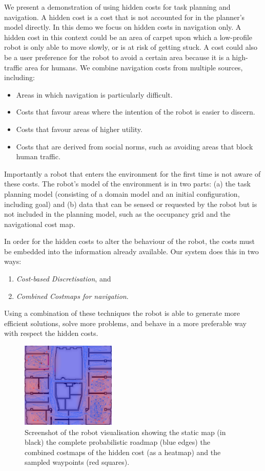 \documentclass[letterpaper]{article}
\begin{document}
We present a demonstration of using hidden costs for task planning and navigation.
%
A hidden cost is a cost that is not accounted for in the planner's model directly. In this demo we focus on hidden costs in navigation only. A hidden cost in this context could be an area of carpet upon which a low-profile robot is only able to move slowly, or is at risk of getting stuck. A cost could also be a user preference for the robot to avoid a certain area because it is a high-traffic area for humans. We combine navigation costs from multiple sources, including:
\begin{itemize}
    \item Areas in which navigation is particularly difficult.
    \item Costs that favour areas where the intention of the robot is easier to discern.
    \item Costs that favour areas of higher utility.
    \item Costs that are derived from social norms, such as avoiding areas that block human traffic.
\end{itemize}
%
Importantly a robot that enters the environment for the first time is not aware of these costs. The robot's model of the environment is in two parts: (a) the task planning model (consisting of a domain model and an initial configuration, including goal) and (b) data that can be sensed or requested by the robot but is not included in the planning model, such as the occupancy grid and the navigational cost map.

In order for the hidden costs to alter the behaviour of the robot, the costs must be embedded into the information already available. Our system does this in two ways:
\begin{enumerate}
    \item \textit{Cost-based Discretisation}, and
    \item \textit{Combined Costmaps for navigation}.
\end{enumerate}
Using a combination of these techniques the robot is able to generate more efficient solutions, solve more problems, and behave in a more preferable way with respect the hidden costs.

\begin{figure}[!th]
    \centering
    \includegraphics[width=0.4\textwidth]{screenshot_heatmap.png}
    \caption{Screenshot of the robot visualisation showing the static map (in black) the complete probabilistic roadmap (blue edges) the combined costmaps of the hidden cost (as a heatmap) and the sampled waypoints (red squares).}
    \label{fig:my_label}
\end{figure}
\end{document}
